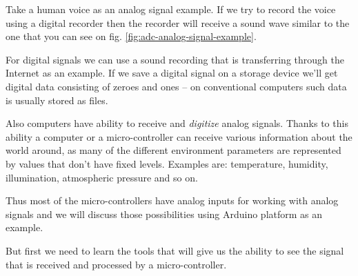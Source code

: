 \documentclass[../sparc.tex]{subfiles}
\begin{document}
Take a human voice as an analog signal example.  If we try to record the voice
using a digital recorder then the recorder will receive a sound wave similar to
the one that you can see on fig. \ref{fig:adc-analog-signal-example}.

For digital signals we can use a sound recording that is transferring through
the Internet as an example.  If we save a digital signal on a storage device
we'll get digital data consisting of zeroes and ones -- on conventional computers
such data is usually stored as files.

Also computers have ability to receive and \emph{digitize} analog signals.
Thanks to this ability a computer or a micro-controller can receive various
information about the world around, as many of the different environment
parameters are represented by values that don’t have fixed levels.  Examples
are: temperature, humidity, illumination, atmospheric pressure and so on.

Thus most of the micro-controllers have analog inputs for working with analog
signals and we will discuss those possibilities using Arduino platform as an
example.

But first we need to learn the tools that will give us the ability to see the
signal that is received and processed by a micro-controller.
\end{document}
